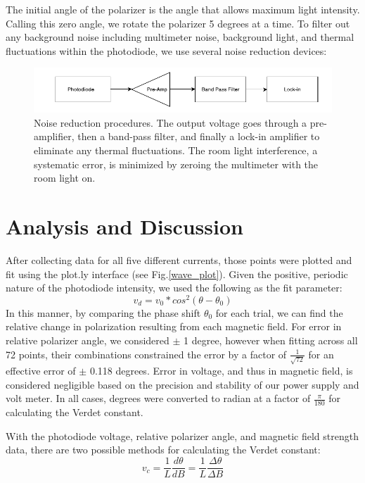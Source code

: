 \documentclass[prb,preprint]{revtex4-1}
\begin{document}
The initial angle of the polarizer is the angle that allows maximum light intensity. Calling this zero angle, we rotate the polarizer 5 degrees at a time. To filter out any background noise including multimeter noise, background light, and thermal fluctuations within the photodiode, we use several noise reduction devices:

\begin{figure}[H]
    \centering
    \includegraphics[width=180mm]{Filter.pdf}
    \caption{Noise reduction procedures. The output voltage goes through a pre-amplifier, then a band-pass filter, and finally a lock-in amplifier to eliminate any thermal fluctuations. The room light interference, a systematic error, is minimized by zeroing the multimeter with the room light on.}
    \end{figure}

\section{Analysis and Discussion}
After collecting data for all five different currents, those points were plotted and fit using the plot.ly interface (see Fig.\ref{wave_plot}). Given the positive, periodic nature of the photodiode intensity, we used the following as the fit parameter:
\begin{equation}
\label{volt eqn}
v_d = v_0*cos^2(\theta -\theta _0)
\end{equation}
In this manner, by comparing the phase shift $\theta_0$ for each trial, we can find the relative change in polarization resulting from each magnetic field. For error in relative polarizer angle, we considered $\pm$ 1 degree, however when fitting across all 72 points, their combinations constrained the error by a factor of $\frac{1}{\sqrt{72}}$ for an effective error of $\pm$ 0.118 degrees. Error in voltage, and thus in magnetic field, is considered negligible based on the precision and stability of our power supply and volt meter. In all cases, degrees were converted to radian at a factor of $\frac{\pi}{180}$ for calculating the Verdet constant.

With the photodiode voltage, relative polarizer angle, and magnetic field strength data, there are two possible methods for calculating the Verdet constant:
\begin{equation}
\label{verdet eqn}
v_c=\frac{1}{L}\frac{d\theta }{dB}=\frac{1}{L}\frac{\Delta \theta }{\Delta B}
\end{equation}
\end{document}
